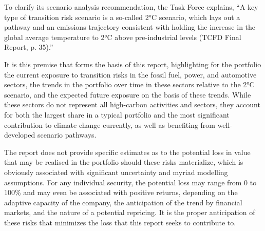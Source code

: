 \documentclass[10pt,table,a4]{article}\usepackage[]{graphicx}\usepackage[]{color}
\begin{document}
\begin{multicols}{2}
		To clarify its scenario analysis recommendation, the Task Force explains, “A key type of transition risk scenario is a so-called 2°C scenario, which lays out a pathway and an emissions trajectory consistent with holding the increase in the global average temperature to 2°C above pre-industrial levels (TCFD Final Report, p. 35).” 
		
		It is this premise that forms the basis of this report, highlighting for the portfolio the current exposure to transition risks in the fossil fuel, power, and automotive sectors, the trends in the portfolio over time in these sectors relative to the 2°C scenario, and the expected future exposure on the basis of these trends. While these sectors do not represent all high-carbon activities and sectors, they account for both the largest share in a typical portfolio and the most significant contribution to climate change currently, as well as benefiting from well-developed scenario pathways.
		
		The report does not provide specific estimates as to the potential loss in value that may be realised in the portfolio should these risks materialize, which is obviously associated with significant uncertainty and myriad modelling assumptions. For any individual security, the potential loss may range from 0 to 100\% and may even be associated with positive returns, depending on the adaptive capacity of the company, the anticipation of the trend by financial markets, and the nature of a potential repricing. It is the proper anticipation of these risks that minimizes the loss that this report seeks to contribute to. 
		
		
	\end{multicols}
	
\end{document}

